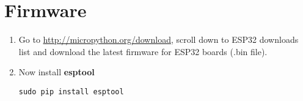 \documentclass[journal,12pt,twocolumn]{IEEEtran}
\begin{document}




\maketitle
\begin{abstract}
This manual shows how to setup the software tools for ESP32 on Raspbian OS.  The process is similar for any Debian style  OS.
\end{abstract}
%
\section{Firmware}

\begin{enumerate}



\item Go to \href{http://micropython.org/download}{ \url{http://micropython.org/download}}, scroll down to ESP32 downloads list and download the latest firmware for ESP32 boards (.bin file).  

\item Now install \textbf{esptool}
\begin{lstlisting}
sudo pip install esptool 
\end{lstlisting}
\end{enumerate}
%
%
%
\end{document}
